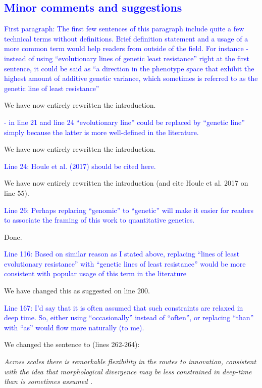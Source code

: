 \documentclass[12pt,letterpaper]{article}
\begin{document}
{\subsection*{\textcolor{blue}{Minor comments and suggestions}}

\textcolor{blue}{First paragraph: The first few sentences of this paragraph include quite a few technical terms without definitions. Brief definition statement and a usage of a more common term would help readers from outside of the field. For instance
- instead of using “evolutionary lines of genetic least resistance” right at the first sentence, it could be said as “a direction in the phenotype space that exhibit the highest amount of additive genetic variance, which sometimes is referred to as the genetic line of least resistance”}

We have now entirely rewritten the introduction.

\textcolor{blue}{- in line 21 and line 24 “evolutionary line” could be replaced by “genetic line” simply because the latter is more well-defined in the literature.}

We have now entirely rewritten the introduction.

\textcolor{blue}{Line 24: Houle et al. (2017) should be cited here.}

We have now entirely rewritten the introduction (and cite Houle et al. 2017 on line 55).

\textcolor{blue}{Line 26: Perhaps replacing “genomic” to “genetic” will make it easier for readers to associate the framing of this work to quantitative genetics.}

Done.

\textcolor{blue}{Line 116: Based on similar reason as I stated above, replacing “lines of least evolutionary resistance” with “genetic lines of least resistance” would be more consistent with popular usage of this term in the literature}

We have changed this as suggested on line 200.

\textcolor{blue}{Line 167: I’d say that it is often assumed that such constraints are relaxed in deep time. So, either using “occasionally” instead of “often”, or replacing “than” with “as” would flow more naturally (to me).}

We changed the sentence to (lines 262-264):

\noindent\textit{Across scales there is remarkable flexibility in the routes to innovation, consistent with the idea that morphological divergence may be less constrained in deep-time than is sometimes assumed \cite{venditti2011multiple}. %
}

}
\end{document}
